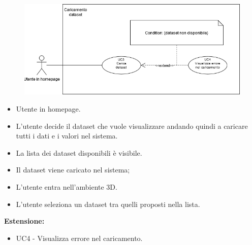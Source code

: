 \begin{figure}[h!]
    \centering
    \includegraphics[scale=0.6]{template/images/UC3.png}
    \caption{}
\end{figure}
    \UCdsc
    { %
        \begin{itemize}
            \item Utente in homepage.
        \end{itemize}
    }
    { %
        \begin{itemize}
            \item L'utente decide il dataset che vuole visualizzare andando quindi a caricare tutti i dati e i valori nel sistema.
        \end{itemize}
    }
    { %
        \begin{itemize}
            \item La lista dei dataset disponibili è visibile.
        \end{itemize}
    }
    { %
        \begin{itemize}
            \item Il dataset viene caricato nel sistema;
            \item L'utente entra nell'ambiente 3D.
        \end{itemize}
    }
    { %
        \begin{itemize}
            \item L'utente seleziona un dataset tra quelli proposti nella lista.
        \end{itemize}
        \item \textbf{Estensione:} \begin{itemize}
            \item UC4 - Visualizza errore nel caricamento.
        \end{itemize}
    }


